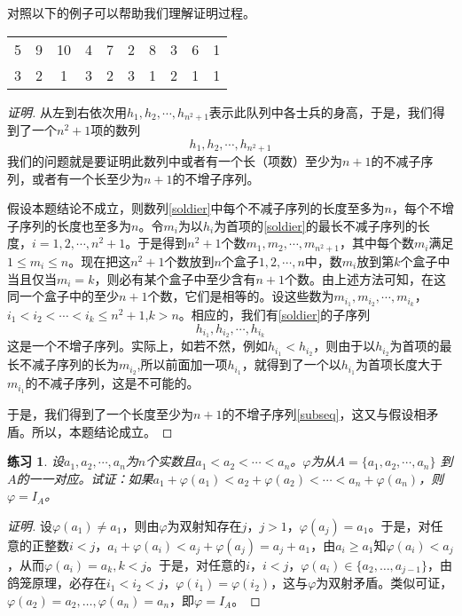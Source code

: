 \documentclass{article}
\newtheorem{Exercise}{练习}
\begin{document}
\begin{CJK*}{UTF8}{gbsn}
  
  对照以下的例子可以帮助我们理解证明过程。

    \begin{tabular}{cccccccccc}
5& 9& 10& 4& 7& 2& 8& 3& 6& 1\\
3& 2& 1&  3& 2& 3& 1& 2& 1& 1\\
  \end{tabular}

  \begin{proof}[证明]
    从左到右依次用$h_1, h_2, \cdots, h_{n^2+1}$表示此队列中各士兵的身高，于是，我们得到了一个$n^2+1$项的数列
    \begin{equation}\label{soldier}
      h_1,h_2,\cdots, h_{n^2+1}
    \end{equation}
    我们的问题就是要证明此数列中或者有一个长（项数）至少为$n+1$的不减子序列，或者有一个长至少为$n+1$的不增子序列。

    假设本题结论不成立，则数列\eqref{soldier}中每个不减子序列的长度至多为$n$，每个不增子序列的长度也至多为$n$。令$m_i$为以$h_i$为首项的\eqref{soldier}的最长不减子序列的长度，$i=1,2,\cdots, n^2+1$。于是得到$n^2+1$个数$m_1,m_2,\cdots,m_{n^2+1}$，其中每个数$m_i$满足$1\leq m_i \leq n$。现在把这$n^2+1$个数放到$n$个盒子$1,2,\cdots,n$中，数$m_i$放到第$k$个盒子中当且仅当$m_i=k$，则必有某个盒子中至少含有$n+1$个数。由上述方法可知，在这同一个盒子中的至少$n+1$个数，它们是相等的。设这些数为$m_{i_1},m_{i_2},\cdots, m_{i_k}$，$i_1<i_2<\cdots<i_k\leq n^2+1$,$k>n$。相应的，我们有\eqref{soldier}的子序列
    \begin{equation}\label{subseq}
    h_{i_1}, h_{i_2}, \cdots, h_{i_k}      
    \end{equation}
    这是一个不增子序列。实际上，如若不然，例如$h_{i_1} < h_{i_2}$，则由于以$h_{i_2}$为首项的最长不减子序列的长为$m_{i_2}$,所以前面加一项$h_{i_1}$，就得到了一个以$h_{i_1}$为首项长度大于$m_{i_1}$的不减子序列，这是不可能的。

    于是，我们得到了一个长度至少为$n+1$的不增子序列\eqref{subseq}，这又与假设相矛盾。所以，本题结论成立。
  \end{proof}
  \begin{Exercise}\justifying\let\raggedright\justifying
    设$a_1, a_2, \cdots, a_n$为$n$个实数且$a_1<a_2<\cdots <a_n$。$\varphi$为从$A=\{a_1,a_2,\cdots,a_n\}$ 到$A$的一一对应。试证：如果$a_1+\varphi(a_1)<a_2+\varphi(a_2)<\cdots < a_n+\varphi(a_n)$，则$\varphi = I_A$。
   \end{Exercise}
  \begin{proof}[证明]
    设$\varphi(a_1)\neq a_1$，则由$\varphi$为双射知存在$j$，$j>1$，$\varphi(a_j)=a_1$。于是，对任意的正整数$i<j$，$a_i+\varphi(a_i)<a_j+\varphi(a_j)=a_j+a_1$，由$a_i\geq a_1$知$\varphi(a_i)< a_j$，从而$\varphi(a_i)=a_k,k<j$。于是，对任意的$i$，$i<j$，$\varphi(a_i)\in \{a_2,\ldots,a_{j-1}\}$，由鸽笼原理，必存在$i_1<i_2<j$，$\varphi(i_1)=\varphi(i_2)$，这与$\varphi$为双射矛盾。类似可证，$\varphi(a_2)=a_2,\ldots,\varphi(a_n)=a_n$，即$\varphi = I_A$。
  

\end{proof}
\end{CJK*}
\end{document}
